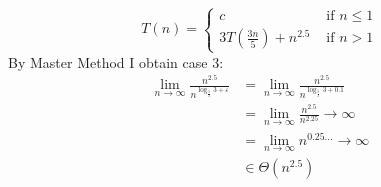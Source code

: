 \documentclass[paper=a4,fontsize=11pt]{article}
\begin{document}
\begin{enumerate}
\[
T(n) = \left\{
\begin{array}{cl}
c & \textrm{ if } n \leq 1\\
3T(\frac{3n}{5}) + n^{2.5} & \textrm{ if } n > 1
\end{array}
\right.
\]
By Master Method I obtain case 3:
\begin{align*}
    \lim_{n\to\infty}{\frac{n^{2.5}}{n^{\log_{\frac{5}{3}}{3}+\varepsilon}}}&=\lim_{n\to\infty}{\frac{n^{2.5}}{n^{\log_{\frac{5}{3}}{3}+0.1}}}\\
    &=\lim_{n\to\infty}{\frac{n^2.5}{n^{2.25}}}\rightarrow\infty\\
    &=\lim_{n\to\infty}{n^{0.25...}}\rightarrow\infty\\
    &\in \Theta(n^{2.5})\\
\end{align*}
\end{enumerate}
\end{document}
